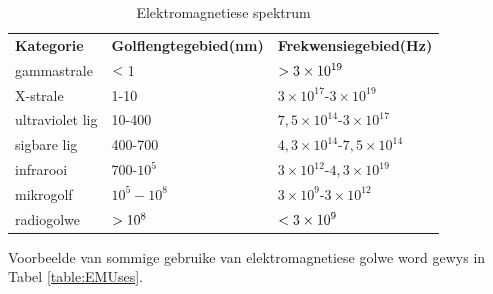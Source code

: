           \begin{table}[H]
        \begin{center}
      \label{m38778*uid8}
    \noindent
    
      \begin{tabular}[t]{|l|l|l|}\hline
                \textbf{Kategorie}
               &
                \textbf{Golflengtegebied(nm)}
               &
                \textbf{Frekwensiegebied(Hz)}
     \tabularnewline\cline{1-1}\cline{2-2}\cline{3-3}
        gammastrale &
        $<{}$1 &
                $>{}3\times{10}^{19}$
     \tabularnewline\cline{1-1}\cline{2-2}\cline{3-3}
        X-strale &
        1-10 &
        $3\ensuremath{\times}{10}^{17}$-$3\ensuremath{\times}{10}^{19}$%
     \tabularnewline\cline{1-1}\cline{2-2}\cline{3-3}
        ultraviolet lig &
        10-400 &
        $7,5\ensuremath{\times}{10}^{14}$-$3\ensuremath{\times}{10}^{17}$%
     \tabularnewline\cline{1-1}\cline{2-2}\cline{3-3}
        sigbare lig &
        400-700 &
        $4,3\ensuremath{\times}{10}^{14}$-$7,5\ensuremath{\times}{10}^{14}$%
     \tabularnewline\cline{1-1}\cline{2-2}\cline{3-3}
        infrarooi &
        700-${10}^{5}$ &
        $3\ensuremath{\times}{10}^{12}$-$4,3\ensuremath{\times}{10}^{19}$%
     \tabularnewline\cline{1-1}\cline{2-2}\cline{3-3}
        mikrogolf &
                ${10}^{5}-{10}^{8}$
               &
        $3\ensuremath{\times}{10}^{9}$-$3\ensuremath{\times}{10}^{12}$%
     \tabularnewline\cline{1-1}\cline{2-2}\cline{3-3}
        radiogolwe &
                $>{}{10}^{8}$
               &
                $<{}3\times{10}^{9}$
     \tabularnewline\cline{1-1}\cline{2-2}\cline{3-3}
    \end{tabular}
      \end{center}
    \caption{Elektromagnetiese spektrum}
    \label{table:EMSpectrumRanges}
\end{table}
    \par
      \label{m38778*id188548} Voorbeelde van sommige gebruike van elektromagnetiese golwe word gewys in Tabel \ref{table:EMUses}.\par 

